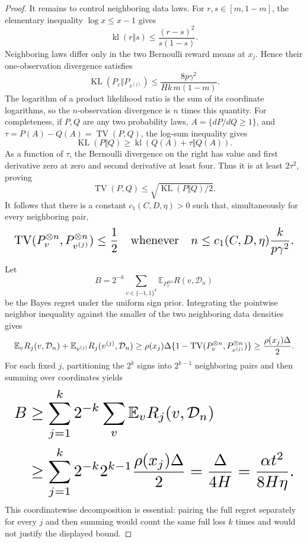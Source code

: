 \documentclass{article}
\begin{document}
\begin{proof}
It remains to control neighboring data laws. For \(r,s\in[m,1-m]\), the elementary inequality \(\log x\le x-1\) gives
\[
\operatorname{kl}(r\Vert s)
\le\frac{(r-s)^2}{s(1-s)}.
\]
Neighboring laws differ only in the two Bernoulli reward means at \(x_j\). Hence their one-observation divergence satisfies
\[
\operatorname{KL}(P_v\Vert P_{v^{(j)}})
\le \frac{8p\gamma^2}{Hk\,m(1-m)}.
\]
The logarithm of a product likelihood ratio is the sum of its coordinate logarithms, so the \(n\)-observation divergence is \(n\) times this quantity. For completeness, if \(P,Q\) are any two probability laws, \(A=\{dP/dQ\ge1\}\), and \(\tau=P(A)-Q(A)=\operatorname{TV}(P,Q)\), the log-sum inequality gives
\[
\operatorname{KL}(P\Vert Q)\ge
\operatorname{kl}(Q(A)+\tau\Vert Q(A)).
\]
As a function of \(\tau\), the Bernoulli divergence on the right has value and first derivative zero at zero and second derivative at least four. Thus it is at least \(2\tau^2\), proving
\[
\operatorname{TV}(P,Q)\le\sqrt{\operatorname{KL}(P\Vert Q)/2}.
\]
It follows that there is a constant \(c_1(C,D,\eta)>0\) such that, simultaneously for every neighboring pair,
\[
\makebox[\linewidth][c]{\resizebox{0.98\linewidth}{!}{\(\displaystyle \operatorname{TV}(P_v^{\otimes n},P_{v^{(j)}}^{\otimes n})\le\frac12
\quad\text{whenever}\quad
n\le c_1(C,D,\eta)\frac{k}{p\gamma^2}.\)}}
\]

Let
\[
B=2^{-k}\sum_{v\in\{-1,1\}^k}
\mathbb E_{P_v^{\otimes n}}R(v,\mathcal D_n)
\]
be the Bayes regret under the uniform sign prior. Integrating the pointwise neighbor inequality against the smaller of the two neighboring data densities gives
\[
\makebox[\linewidth][c]{\resizebox{0.98\linewidth}{!}{\(\displaystyle \mathbb E_vR_j(v,\mathcal D_n)
+\mathbb E_{v^{(j)}}R_j(v^{(j)},\mathcal D_n)
\ge \rho(x_j)\Delta
\{1-\operatorname{TV}(P_v^{\otimes n},P_{v^{(j)}}^{\otimes n})\}
\ge\frac{\rho(x_j)\Delta}{2}.\)}}
\]
For each fixed \(j\), partitioning the \(2^k\) signs into \(2^{k-1}\) neighboring pairs and then summing over coordinates yields
\[
\makebox[\linewidth][c]{\resizebox{0.98\linewidth}{!}{\(\displaystyle \begin{aligned}
B
&\ge\sum_{j=1}^k2^{-k}\sum_v
\mathbb E_vR_j(v,\mathcal D_n)\\
&\ge\sum_{j=1}^k2^{-k}2^{k-1}
\frac{\rho(x_j)\Delta}{2}
=\frac{\Delta}{4H}
=\frac{\alpha t^2}{8H\eta}.
\end{aligned}\)}}
\]
This coordinatewise decomposition is essential: pairing the full regret separately for every \(j\) and then summing would count the same full loss \(k\) times and would not justify the displayed bound.


\end{proof}
\end{document}
